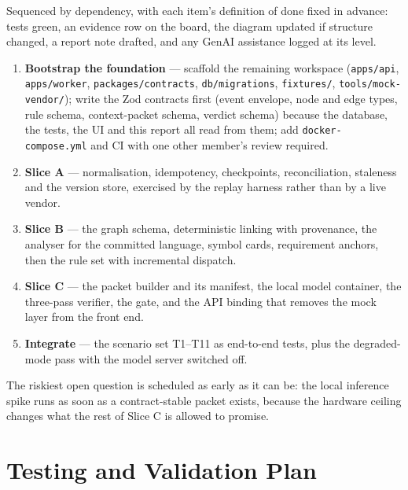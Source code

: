 Sequenced by dependency, with each item's definition of done fixed in advance:
tests green, an evidence row on the board, the diagram updated if structure
changed, a report note drafted, and any GenAI assistance logged at its level.

\begin{enumerate}
  \item \textbf{Bootstrap the foundation} --- scaffold the remaining workspace
        (\texttt{apps/api}, \texttt{apps/worker},
        \texttt{packages/contracts}, \texttt{db/migrations},
        \texttt{fixtures/}, \texttt{tools/mock-vendor/}); write the Zod
        contracts first (event envelope, node and edge types, rule schema,
        context-packet schema, verdict schema) because the database, the tests,
        the UI and this report all read from them; add
        \texttt{docker-compose.yml} and CI with one other member's review
        required.
  \item \textbf{Slice A} --- normalisation, idempotency, checkpoints,
        reconciliation, staleness and the version store, exercised by the
        replay harness rather than by a live vendor.
  \item \textbf{Slice B} --- the graph schema, deterministic linking with
        provenance, the analyser for the committed language, symbol cards,
        requirement anchors, then the rule set with incremental dispatch.
  \item \textbf{Slice C} --- the packet builder and its manifest, the local model
        container, the three-pass verifier, the gate, and the API binding that
        removes the mock layer from the front end.
  \item \textbf{Integrate} --- the scenario set T1--T11 as end-to-end tests, plus
        the degraded-mode pass with the model server switched off.
\end{enumerate}

The riskiest open question is scheduled as early as it can be: the local
inference spike runs as soon as a contract-stable packet exists, because the
hardware ceiling changes what the rest of Slice C is allowed to promise.

\section{Testing and Validation Plan}
\label{sec:testing-plan}

